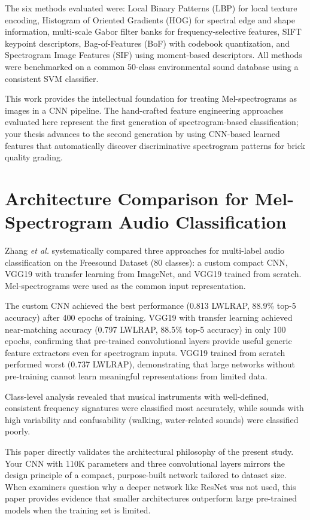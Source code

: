 \documentclass[12pt,a4paper,oneside]{report}
\begin{document}
The six methods evaluated were: Local Binary Patterns (LBP) for local texture encoding, Histogram of Oriented Gradients (HOG) for spectral edge and shape information, multi-scale Gabor filter banks for frequency-selective features, SIFT keypoint descriptors, Bag-of-Features (BoF) with codebook quantization, and Spectrogram Image Features (SIF) using moment-based descriptors. All methods were benchmarked on a common 50-class environmental sound database using a consistent SVM classifier.

This work provides the intellectual foundation for treating Mel-spectrograms as images in a CNN pipeline. The hand-crafted feature engineering approaches evaluated here represent the first generation of spectrogram-based classification; your thesis advances to the second generation by using CNN-based learned features that automatically discover discriminative spectrogram patterns for brick quality grading.

\section{Architecture Comparison for Mel-Spectrogram Audio Classification}

Zhang \textit{et al.} \cite{zhang2019} systematically compared three approaches for multi-label audio classification on the Freesound Dataset (80 classes): a custom compact CNN, VGG19 with transfer learning from ImageNet, and VGG19 trained from scratch. Mel-spectrograms were used as the common input representation.

The custom CNN achieved the best performance (0.813 LWLRAP, 88.9\% top-5 accuracy) after 400 epochs of training. VGG19 with transfer learning achieved near-matching accuracy (0.797 LWLRAP, 88.5\% top-5 accuracy) in only 100 epochs, confirming that pre-trained convolutional layers provide useful generic feature extractors even for spectrogram inputs. VGG19 trained from scratch performed worst (0.737 LWLRAP), demonstrating that large networks without pre-training cannot learn meaningful representations from limited data.

Class-level analysis revealed that musical instruments with well-defined, consistent frequency signatures were classified most accurately, while sounds with high variability and confusability (walking, water-related sounds) were classified poorly.

This paper directly validates the architectural philosophy of the present study. Your CNN with 110K parameters and three convolutional layers mirrors the design principle of a compact, purpose-built network tailored to dataset size. When examiners question why a deeper network like ResNet was not used, this paper provides evidence that smaller architectures outperform large pre-trained models when the training set is limited.
\end{document}
